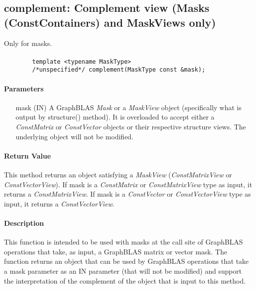 \subsection{{\sf complement}: Complement view (Masks (ConstContainers) and MaskViews only)}

Only for masks.  

\paragraph{\syntax}

\begin{verbatim}
        template <typename MaskType>
        /*unspecified*/ complement(MaskType const &mask);
\end{verbatim}

\paragraph{Parameters}

\begin{itemize}%
    \item[{\sf mask}] ({\sf IN}) A GraphBLAS \emph{Mask} or a \emph{MaskView}
    object (specifically what is output by structure() method). It is 
    overloaded to accept either a \emph{ConstMatrix} or \emph{ConstVector} 
    objects or their respective structure views.  The underlying object will 
    not be modified.
\end{itemize}

\paragraph{Return Value}

This method returns an object satisfying a \emph{MaskView} (\emph{ConstMatrixView} or 
\emph{ConstVectorView}). If {\sf mask} is a \emph{ConstMatrix} or \emph{ConstMatrixView} type as input, 
it returns a \emph{ConstMatrixView}.  If {\sf mask} is a \emph{ConstVector} or  \emph{ConstVectorView}
type as input, it returns a \emph{ConstVectorView}.  

\paragraph{Description}

This function is intended to be used with masks at the call site of GraphBLAS 
operations that take, as input, a GraphBLAS matrix or vector mask.  The function 
returns an object that can be used by GraphBLAS operations that take a mask 
parameter as an {\sf IN} parameter (that will not be modified) and support the 
interpretation of the complement of the object that is input to this method.

